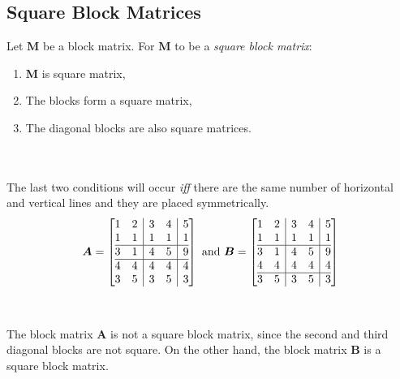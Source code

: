 \documentclass[../setup.tex]{subfiles}
\begin{document}
\subsection{Square Block Matrices}
\begin{theorem}
Let $\bm{M}$ be a block matrix. For $\bm{M}$ to be a \textit{square block matrix}:
\begin{enumerate}
	\item $\bm{M}$ is square matrix,
	\item The blocks form a square matrix,
	\item The diagonal blocks are also square matrices.
\end{enumerate}
\end{theorem}
\phantom \\ \\
The last two conditions will occur \textit{iff} there are the same number of horizontal and vertical lines and they are placed symmetrically. \\
\[\bm{A} = 
\left[\begin{array}{@{}cc|cc|c@{}}
    	1 & 2 & 3 & 4 & 5 \\
    	1 & 1 & 1 & 1 & 1 \\
\hline
    	3 & 1 & 4 & 5 & 9 \\
\hline
	4 & 4 & 4 & 4 & 4 \\
	3 & 5 & 3 & 5 & 3 \\
  \end{array}\right]
\text{ and }
\bm{B} =
\left[\begin{array}{@{}cc|cc|c@{}}
    	1 & 2 & 3 & 4 & 5 \\
    	1 & 1 & 1 & 1 & 1 \\
\hline
    	3 & 1 & 4 & 5 & 9 \\
	4 & 4 & 4 & 4 & 4 \\
\hline
	3 & 5 & 3 & 5 & 3 \\
  \end{array}\right]\] 
\phantom \\ \\
The block matrix $\bm{A}$ is not a square block matrix, since the second and third diagonal blocks are not square. On the other hand, the block matrix $\bm{B}$ is a square block matrix. \\
\end{document}
